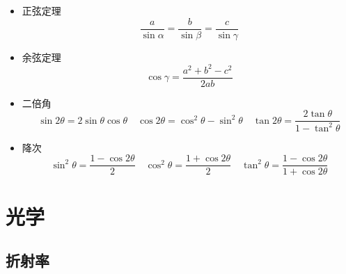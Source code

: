 \documentclass{article}
\begin{document}
\begin{formal}
\begin{itemize}
        \item 正弦定理
              $$ \dfrac{a}{\sin{\alpha}} = \dfrac{b}{\sin{\beta}} = \dfrac{c}{\sin{\gamma}}   $$

        \item 余弦定理
              $$ \cos{\gamma} = \dfrac{a^{2}+b^{2} - c^{2}}{2ab} $$

        \item 二倍角
              $$ \sin{2\theta} = 2\sin{\theta}\cos{\theta} \quad \cos{2\theta} = \cos^{2}{\theta} - \sin^{2}{\theta} \quad \tan{2\theta} = \dfrac{2\tan{\theta}}{1-\tan^{2}{\theta}}$$

        \item 降次
              $$ \sin^{2}{\theta} = \dfrac{1 - \cos{2\theta}}{2} \quad \cos^{2}{\theta} = \dfrac{1 + \cos{2\theta}}{2} \quad \tan^{2}{\theta} = \dfrac{1-\cos{2\theta}}{1+\cos{2\theta}}$$
    \end{itemize}
\end{formal}

\vspace{2em}

\newpage

\section{光学}
\subsection{折射率}
\end{document}
